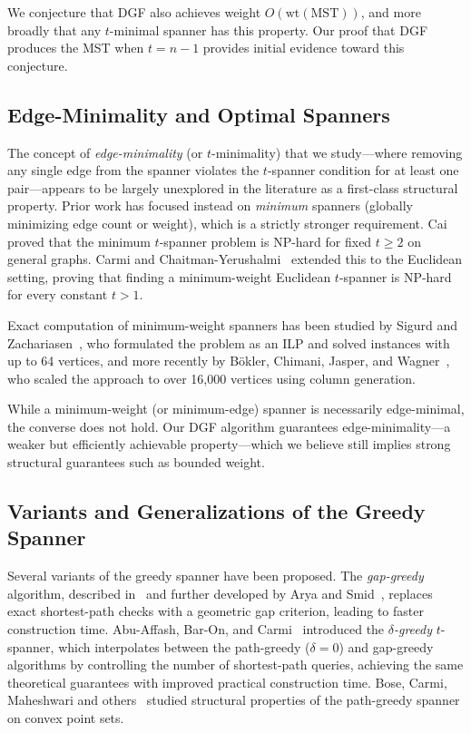 \documentclass{article}
\begin{document}
We conjecture that DGF also achieves weight $O(\mathrm{wt}(\mathrm{MST}))$, and more broadly that any $t$-minimal spanner has this property. Our proof that DGF produces the MST when $t = n-1$ provides initial evidence toward this conjecture.

\subsection{Edge-Minimality and Optimal Spanners}

The concept of \emph{edge-minimality} (or $t$-minimality) that we study---where removing any single edge from the spanner violates the $t$-spanner condition for at least one pair---appears to be largely unexplored in the literature as a first-class structural property. Prior work has focused instead on \emph{minimum} spanners (globally minimizing edge count or weight), which is a strictly stronger requirement. Cai~\cite{cai1994np} proved that the minimum $t$-spanner problem is NP-hard for fixed $t \geq 2$ on general graphs. Carmi and Chaitman-Yerushalmi~\cite{carmi2013minimum} extended this to the Euclidean setting, proving that finding a minimum-weight Euclidean $t$-spanner is NP-hard for every constant $t > 1$.

Exact computation of minimum-weight spanners has been studied by Sigurd and Zachariasen~\cite{sigurd2004construction}, who formulated the problem as an ILP and solved instances with up to 64 vertices, and more recently by B\"okler, Chimani, Jasper, and Wagner~\cite{bokler2024exact}, who scaled the approach to over 16,000 vertices using column generation.

While a minimum-weight (or minimum-edge) spanner is necessarily edge-minimal, the converse does not hold. Our DGF algorithm guarantees edge-minimality---a weaker but efficiently achievable property---which we believe still implies strong structural guarantees such as bounded weight.

\subsection{Variants and Generalizations of the Greedy Spanner}

Several variants of the greedy spanner have been proposed. The \emph{gap-greedy} algorithm, described in~\cite{narasimhan2007geometric} and further developed by Arya and Smid~\cite{arya1997efficient}, replaces exact shortest-path checks with a geometric gap criterion, leading to faster construction time. Abu-Affash, Bar-On, and Carmi~\cite{abuaffash2021delta} introduced the \emph{$\delta$-greedy} $t$-spanner, which interpolates between the path-greedy ($\delta = 0$) and gap-greedy algorithms by controlling the number of shortest-path queries, achieving the same theoretical guarantees with improved practical construction time. Bose, Carmi, Maheshwari and others~\cite{bose2023path} studied structural properties of the path-greedy spanner on convex point sets.
\end{document}
